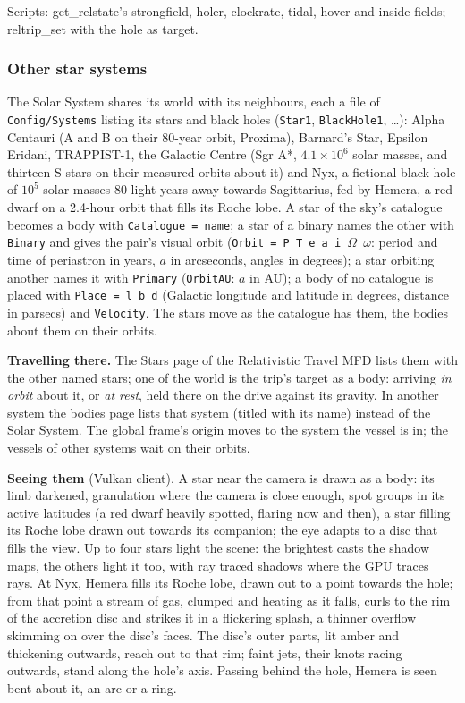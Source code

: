\documentclass[Orbiter User Manual.tex]{subfiles}
\begin{document}
Scripts: get\_relstate's strongfield, holer, clockrate, tidal, hover and inside fields; reltrip\_set with the hole as target.

\subsubsection{Other star systems}
The Solar System shares its world with its neighbours, each a file of \texttt{Config/Systems} listing its stars and black holes (\texttt{Star1}, \texttt{BlackHole1}, \ldots): Alpha Centauri (A and B on their 80-year orbit, Proxima), Barnard's Star, Epsilon Eridani, TRAPPIST-1, the Galactic Centre (Sgr A*, $4.1 \times 10^6$ solar masses, and thirteen S-stars on their measured orbits about it) and Nyx, a fictional black hole of $10^5$ solar masses 80 light years away towards Sagittarius, fed by Hemera, a red dwarf on a 2.4-hour orbit that fills its Roche lobe. A star of the sky's catalogue becomes a body with \texttt{Catalogue = name}; a star of a binary names the other with \texttt{Binary} and gives the pair's visual orbit (\texttt{Orbit = P T e a i $\Omega$ $\omega$}: period and time of periastron in years, $a$ in arcseconds, angles in degrees); a star orbiting another names it with \texttt{Primary} (\texttt{OrbitAU}: $a$ in AU); a body of no catalogue is placed with \texttt{Place = l b d} (Galactic longitude and latitude in degrees, distance in parsecs) and \texttt{Velocity}. The stars move as the catalogue has them, the bodies about them on their orbits.

\textbf{Travelling there.} The Stars page of the Relativistic Travel MFD lists them with the other named stars; one of the world is the trip's target as a body: arriving \textit{in orbit} about it, or \textit{at rest}, held there on the drive against its gravity. In another system the bodies page lists that system (titled with its name) instead of the Solar System. The global frame's origin moves to the system the vessel is in; the vessels of other systems wait on their orbits.

\textbf{Seeing them} (Vulkan client). A star near the camera is drawn as a body: its limb darkened, granulation where the camera is close enough, spot groups in its active latitudes (a red dwarf heavily spotted, flaring now and then), a star filling its Roche lobe drawn out towards its companion; the eye adapts to a disc that fills the view. Up to four stars light the scene: the brightest casts the shadow maps, the others light it too, with ray traced shadows where the GPU traces rays. At Nyx, Hemera fills its Roche lobe, drawn out to a point towards the hole; from that point a stream of gas, clumped and heating as it falls, curls to the rim of the accretion disc and strikes it in a flickering splash, a thinner overflow skimming on over the disc's faces. The disc's outer parts, lit amber and thickening outwards, reach out to that rim; faint jets, their knots racing outwards, stand along the hole's axis. Passing behind the hole, Hemera is seen bent about it, an arc or a ring.
\end{document}
